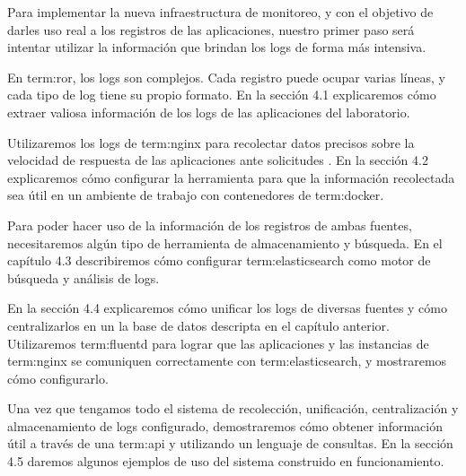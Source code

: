 Para implementar la nueva infraestructura de monitoreo, y con el objetivo de
darles uso real a los registros de las aplicaciones, nuestro primer paso será
intentar utilizar la información que brindan los logs de forma más intensiva.

En \gls{term:ror}, los logs son complejos. Cada registro puede ocupar varias
líneas, y cada tipo de log tiene su propio formato. En la sección 4.1
explicaremos cómo extraer valiosa información de los logs de las aplicaciones
del laboratorio.

Utilizaremos los logs de \gls{term:nginx} para recolectar datos precisos sobre
la velocidad de respuesta de las aplicaciones ante solicitudes .
En la sección 4.2 explicaremos cómo configurar la herramienta para que la
información recolectada sea útil en un ambiente de trabajo con contenedores de
\gls{term:docker}.

Para poder hacer uso de la información de los registros de ambas fuentes,
necesitaremos algún tipo de herramienta de almacenamiento y búsqueda. En el
capítulo 4.3 describiremos cómo configurar \gls{term:elasticsearch} como motor
de búsqueda y análisis de logs.

En la sección 4.4 explicaremos cómo unificar los logs de diversas fuentes y
cómo centralizarlos en un la base de datos descripta en el capítulo anterior.
Utilizaremos \gls{term:fluentd} para lograr que las aplicaciones y las
instancias de \gls{term:nginx} se comuniquen correctamente con
\gls{term:elasticsearch}, y mostraremos cómo configurarlo.

Una vez que tengamos todo el sistema de recolección, unificación,
centralización y almacenamiento de logs configurado, demostraremos cómo obtener
información útil a través de una \gls{term:api} y utilizando un lenguaje de
consultas. En la sección 4.5 daremos algunos ejemplos de uso del sistema
construido en funcionamiento.
